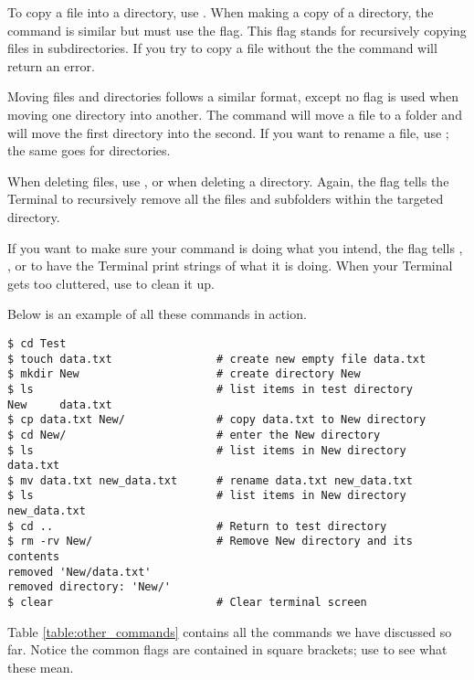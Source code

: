 To copy a file into a directory, use .
When making a copy of a directory, the command is similar but must use the  flag.
This flag stands for recursively copying files in subdirectories.
If you try to copy a file without the  the command will return an error.

Moving files and directories follows a similar format, except no  flag is used when moving one directory into another.
The command  will move a file to a folder and  will move the first directory into the second.
If you want to rename a file, use ; the same goes for directories.

When deleting files, use , or  when deleting a directory.
Again, the  flag tells the Terminal to recursively remove all the files and subfolders within the targeted directory.

If you want to make sure your command is doing what you intend, the  flag tells , , or  to have the Terminal print strings of what it is doing.
When your Terminal gets too cluttered, use  to clean it up.

Below is an example of all these commands in action.
\begin{lstlisting}
$ cd Test
$ touch data.txt				# create new empty file data.txt
$ mkdir New						# create directory New
$ ls							# list items in test directory
New 	data.txt
$ cp data.txt New/				# copy data.txt to New directory
$ cd New/						# enter the New directory
$ ls							# list items in New directory
data.txt
$ mv data.txt new_data.txt		# rename data.txt new_data.txt
$ ls							# list items in New directory
new_data.txt
$ cd ..							# Return to test directory
$ rm -rv New/					# Remove New directory and its contents
removed 'New/data.txt'
removed directory: 'New/'
$ clear							# Clear terminal screen
\end{lstlisting}

Table \ref{table:other_commands} contains all the commands we have discussed so far.
Notice the common flags are contained in square brackets; use  to see what these mean.

